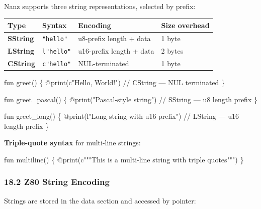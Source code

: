 \documentclass[
  11pt,
]{article}
\newenvironment{Shaded}{\begin{snugshade}}{\end{snugshade}}
\newcommand{\NormalTok}[1]{#1}
\begin{document}
Nanz supports three string representations, selected by prefix:

\begin{longtable}[]{@{}llll@{}}
\toprule\noalign{}
Type & Syntax & Encoding & Size overhead \\
\midrule\noalign{}
\endhead
\bottomrule\noalign{}
\endlastfoot
\textbf{SString} & \texttt{"hello"} & u8-prefix length + data & 1
byte \\
\textbf{LString} & \texttt{l"hello"} & u16-prefix length + data & 2
bytes \\
\textbf{CString} & \texttt{c"hello"} & NUL-terminated & 1 byte \\
\end{longtable}

\begin{Shaded}
\begin{Highlighting}[]
\NormalTok{fun greet() \{}
\NormalTok{    @print(c"Hello, World!")          // CString — NUL terminated}
\NormalTok{\}}

\NormalTok{fun greet\_pascal() \{}
\NormalTok{    @print("Pascal{-}style string")     // SString — u8 length prefix}
\NormalTok{\}}

\NormalTok{fun greet\_long() \{}
\NormalTok{    @print(l"Long string with u16 prefix")  // LString — u16 length prefix}
\NormalTok{\}}
\end{Highlighting}
\end{Shaded}

\textbf{Triple-quote syntax} for multi-line strings:

\begin{Shaded}
\begin{Highlighting}[]
\NormalTok{fun multiline() \{}
\NormalTok{    @print(c"""This is a}
\NormalTok{multi{-}line string}
\NormalTok{with triple quotes""")}
\NormalTok{\}}
\end{Highlighting}
\end{Shaded}

\hypertarget{z80-string-encoding}{%
\subsubsection{18.2 Z80 String Encoding}\label{z80-string-encoding}}

Strings are stored in the data section and accessed by pointer:
\end{document}

